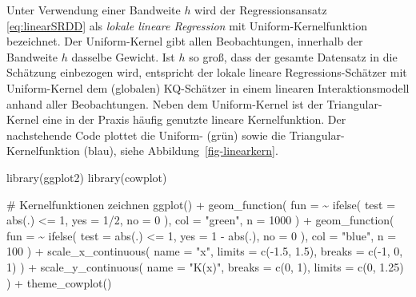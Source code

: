 \documentclass[
  a4paper,
  DIV=11,
  oneside]{scrreprt}
\newenvironment{Shaded}{\begin{snugshade}}{\end{snugshade}}
\newcommand{\AttributeTok}[1]{\textcolor[rgb]{0.40,0.45,0.13}{#1}}
\newcommand{\CommentTok}[1]{\textcolor[rgb]{0.37,0.37,0.37}{#1}}
\newcommand{\DecValTok}[1]{\textcolor[rgb]{0.68,0.00,0.00}{#1}}
\newcommand{\FloatTok}[1]{\textcolor[rgb]{0.68,0.00,0.00}{#1}}
\newcommand{\FunctionTok}[1]{\textcolor[rgb]{0.28,0.35,0.67}{#1}}
\newcommand{\NormalTok}[1]{\textcolor[rgb]{0.00,0.23,0.31}{#1}}
\newcommand{\SpecialCharTok}[1]{\textcolor[rgb]{0.37,0.37,0.37}{#1}}
\newcommand{\StringTok}[1]{\textcolor[rgb]{0.13,0.47,0.30}{#1}}
\begin{document}
Unter Verwendung einer Bandweite \(h\) wird der Regressionsansatz
\eqref{eq:linearSRDD} als \emph{lokale lineare Regression} mit
Uniform-Kernelfunktion bezeichnet. Der Uniform-Kernel gibt allen
Beobachtungen, innerhalb der Bandweite \(h\) dasselbe Gewicht. Ist \(h\)
so groß, dass der gesamte Datensatz in die Schätzung einbezogen wird,
entspricht der lokale lineare Regressions-Schätzer mit Uniform-Kernel
dem (globalen) KQ-Schätzer in einem linearen Interaktionsmodell anhand
aller Beobachtungen. Neben dem Uniform-Kernel ist der Triangular-Kernel
eine in der Praxis häufig genutzte lineare Kernelfunktion. Der
nachstehende Code plottet die Uniform- (grün) sowie die
Triangular-Kernelfunktion (blau), siehe Abbildung~\ref{fig-linearkern}.

\begin{Shaded}
\begin{Highlighting}[]
\FunctionTok{library}\NormalTok{(ggplot2)}
\FunctionTok{library}\NormalTok{(cowplot)}

\CommentTok{\# Kernelfunktionen zeichnen}
\FunctionTok{ggplot}\NormalTok{() }\SpecialCharTok{+} 
    \FunctionTok{geom\_function}\NormalTok{(}
      \AttributeTok{fun =} \SpecialCharTok{\textasciitilde{}} \FunctionTok{ifelse}\NormalTok{(}
        \AttributeTok{test =} \FunctionTok{abs}\NormalTok{(.) }\SpecialCharTok{\textless{}=} \DecValTok{1}\NormalTok{,}
        \AttributeTok{yes =}  \DecValTok{1}\SpecialCharTok{/}\DecValTok{2}\NormalTok{, }
        \AttributeTok{no =} \DecValTok{0}
\NormalTok{      ), }
      \AttributeTok{col =} \StringTok{"green"}\NormalTok{, }
      \AttributeTok{n =} \DecValTok{1000}
\NormalTok{      ) }\SpecialCharTok{+} 
    \FunctionTok{geom\_function}\NormalTok{(}
      \AttributeTok{fun =} \SpecialCharTok{\textasciitilde{}} \FunctionTok{ifelse}\NormalTok{(}
        \AttributeTok{test =} \FunctionTok{abs}\NormalTok{(.) }\SpecialCharTok{\textless{}=} \DecValTok{1}\NormalTok{, }
        \AttributeTok{yes =} \DecValTok{1} \SpecialCharTok{{-}} \FunctionTok{abs}\NormalTok{(.), }
        \AttributeTok{no =} \DecValTok{0}
\NormalTok{      ), }
      \AttributeTok{col =} \StringTok{"blue"}\NormalTok{, }
      \AttributeTok{n =} \DecValTok{100}
\NormalTok{      ) }\SpecialCharTok{+} 
    \FunctionTok{scale\_x\_continuous}\NormalTok{(}
      \AttributeTok{name =} \StringTok{"x"}\NormalTok{, }
      \AttributeTok{limits =} \FunctionTok{c}\NormalTok{(}\SpecialCharTok{{-}}\FloatTok{1.5}\NormalTok{, }\FloatTok{1.5}\NormalTok{), }
      \AttributeTok{breaks =} \FunctionTok{c}\NormalTok{(}\SpecialCharTok{{-}}\DecValTok{1}\NormalTok{, }\DecValTok{0}\NormalTok{, }\DecValTok{1}\NormalTok{)}
\NormalTok{    ) }\SpecialCharTok{+}
    \FunctionTok{scale\_y\_continuous}\NormalTok{(}
      \AttributeTok{name =} \StringTok{"K(x)"}\NormalTok{, }
      \AttributeTok{breaks =} \FunctionTok{c}\NormalTok{(}\DecValTok{0}\NormalTok{, }\DecValTok{1}\NormalTok{), }
      \AttributeTok{limits =} \FunctionTok{c}\NormalTok{(}\DecValTok{0}\NormalTok{, }\FloatTok{1.25}\NormalTok{)}
\NormalTok{    ) }\SpecialCharTok{+}
    \FunctionTok{theme\_cowplot}\NormalTok{()}
\end{Highlighting}
\end{Shaded}
\end{document}
